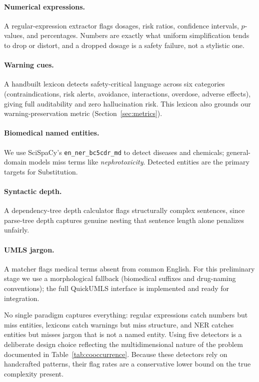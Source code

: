 \documentclass[11pt]{article}
\begin{document}
\paragraph{Numerical expressions.} A regular-expression extractor flags
dosages, risk ratios, confidence intervals, $p$-values, and percentages.
Numbers are exactly what uniform simplification tends to drop or distort,
and a dropped dosage is a safety failure, not a stylistic one.

\paragraph{Warning cues.} A handbuilt lexicon detects safety-critical
language across six categories (contraindications, risk alerts,
avoidance, interactions, overdose, adverse effects), giving full
auditability and zero hallucination risk. This lexicon also grounds our
warning-preservation metric (Section~\ref{sec:metrics}).

\paragraph{Biomedical named entities.} We use SciSpaCy's
\texttt{en\_ner\_bc5cdr\_md} \citep{neumann2019scispacy} to detect diseases
and chemicals; general-domain models miss terms like \emph{nephrotoxicity}.
Detected entities are the primary targets for Substitution.

\paragraph{Syntactic depth.} A dependency-tree depth calculator flags
structurally complex sentences, since parse-tree depth captures genuine
nesting that sentence length alone penalizes unfairly.

\paragraph{UMLS jargon.} A matcher flags medical terms absent from common
English. For this preliminary stage we use a morphological fallback
(biomedical suffixes and drug-naming conventions); the full QuickUMLS
interface is implemented and ready for integration.

No single paradigm captures everything: regular expressions catch numbers but
miss entities, lexicons catch warnings but miss structure, and NER catches
entities but misses jargon that is not a named entity. Using five detectors is a
deliberate design choice reflecting the multidimensional nature of the problem
documented in Table~\ref{tab:cooccurrence}. Because these detectors rely on
handcrafted patterns, their flag rates are a conservative lower bound on the true
complexity present.
\end{document}

